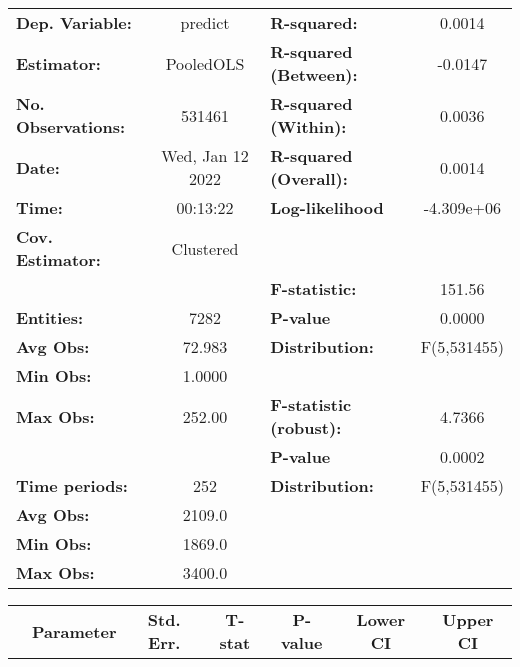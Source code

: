 \begin{center}
\begin{tabular}{lclc}
\toprule
\textbf{Dep. Variable:}    &      predict       & \textbf{  R-squared:         }   &      0.0014      \\
\textbf{Estimator:}        &     PooledOLS      & \textbf{  R-squared (Between):}  &     -0.0147      \\
\textbf{No. Observations:} &       531461       & \textbf{  R-squared (Within):}   &      0.0036      \\
\textbf{Date:}             &  Wed, Jan 12 2022  & \textbf{  R-squared (Overall):}  &      0.0014      \\
\textbf{Time:}             &      00:13:22      & \textbf{  Log-likelihood     }   &    -4.309e+06    \\
\textbf{Cov. Estimator:}   &     Clustered      & \textbf{                     }   &                  \\
\textbf{}                  &                    & \textbf{  F-statistic:       }   &      151.56      \\
\textbf{Entities:}         &        7282        & \textbf{  P-value            }   &      0.0000      \\
\textbf{Avg Obs:}          &       72.983       & \textbf{  Distribution:      }   &   F(5,531455)    \\
\textbf{Min Obs:}          &       1.0000       & \textbf{                     }   &                  \\
\textbf{Max Obs:}          &       252.00       & \textbf{  F-statistic (robust):} &      4.7366      \\
\textbf{}                  &                    & \textbf{  P-value            }   &      0.0002      \\
\textbf{Time periods:}     &        252         & \textbf{  Distribution:      }   &   F(5,531455)    \\
\textbf{Avg Obs:}          &       2109.0       & \textbf{                     }   &                  \\
\textbf{Min Obs:}          &       1869.0       & \textbf{                     }   &                  \\
\textbf{Max Obs:}          &       3400.0       & \textbf{                     }   &                  \\
\bottomrule
\end{tabular}
\begin{tabular}{lcccccc}
                & \textbf{Parameter} & \textbf{Std. Err.} & \textbf{T-stat} & \textbf{P-value} & \textbf{Lower CI} & \textbf{Upper CI}  \\

\end{tabular}
\end{center}
